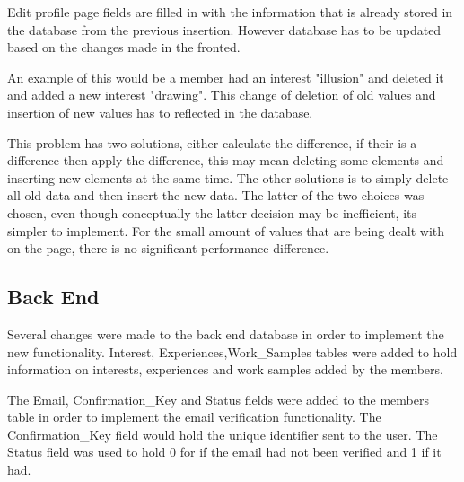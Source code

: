 \documentclass[a4paper,oneside,11pt]{report}
\begin{document}
Edit profile page fields are filled in with the information that is already stored in the database from the previous insertion. However database has to be updated based on the changes made in the fronted.
\pagebreak

An example of this would be a member had an interest "illusion" and deleted it and added a new interest "drawing". This change of deletion of old values and insertion of new values has to reflected in the database.

This problem has two solutions, either calculate the difference, if their is a difference then apply the difference, this may mean deleting some elements and inserting new elements at the same time. The other solutions is to simply delete all old data and then insert the new data. The latter of the two choices was chosen, even though conceptually the latter decision may be inefficient, its simpler to implement. For the small amount of values that are being dealt with on the page, there is no significant performance difference.
\pagebreak
\subsection{Back End}
Several changes were made to the back end database in order to implement the new functionality. Interest, Experiences,Work\_Samples tables were added to hold information on interests, experiences and work samples added by the members.

The Email, Confirmation\_Key and Status fields were added to the members table in order to implement the email verification functionality. The Confirmation\_Key field would hold the unique identifier sent to the user. The Status field was used to hold 0 for if the email had not been verified and 1 if it had.
\end{document}
